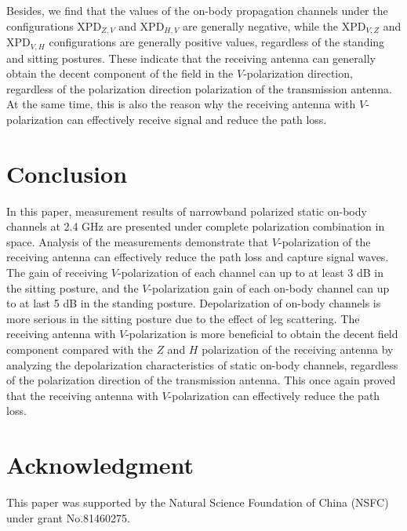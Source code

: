 \documentclass[conference]{IEEEtran}
\begin{document}

Besides, we find that the values of the on-body propagation channels under the configurations $\text{XPD}_{Z,V}$ and $\text{XPD}_{H,V}$ are generally negative, while the $\text{XPD}_{V,Z}$ and $\text{XPD}_{V,H}$ configurations are generally positive values, regardless of the standing and sitting postures. These indicate that the receiving antenna can generally obtain the decent component of the field in the $V$-polarization direction, regardless of the polarization direction polarization of the transmission antenna. At the same time, this is also the reason why the receiving antenna with $V$-polarization can effectively receive signal and reduce the path loss.

\section{Conclusion}\label{sec:conclusion}
In this paper, measurement results of narrowband polarized static on-body channels at 2.4 GHz are presented under complete polarization combination in space. Analysis of the measurements demonstrate that $V$-polarization of the receiving antenna can effectively reduce the path loss and capture signal waves. The gain of receiving $V$-polarization of each channel can up to at least 3 dB in the sitting posture, and the $V$-polarization gain of each on-body channel can up to at last 5 dB in the standing posture. Depolarization of on-body channels is more serious in the sitting posture due to the effect of leg scattering. The receiving antenna with $V$-polarization is more beneficial to obtain the decent field component compared with the $Z$ and $H$ polarization of the receiving antenna by analyzing the depolarization characteristics of static on-body channels, regardless of the polarization direction of the transmission antenna. This once again proved that the receiving antenna with $V$-polarization can effectively reduce the path loss.

\section*{Acknowledgment}
This paper was supported by the Natural Science Foundation of China (NSFC) under grant No.81460275.
\end{document}
